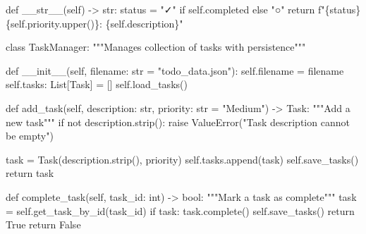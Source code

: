 \documentclass[
  letterpaper,
  DIV=11,
  numbers=noendperiod,
  oneside]{scrreprt}
\newenvironment{Shaded}{}{}
\newcommand{\BuiltInTok}[1]{\textcolor[rgb]{0.84,0.23,0.29}{#1}}
\newcommand{\CommentTok}[1]{\textcolor[rgb]{0.42,0.45,0.49}{#1}}
\newcommand{\ControlFlowTok}[1]{\textcolor[rgb]{0.84,0.23,0.29}{#1}}
\newcommand{\FunctionTok}[1]{\textcolor[rgb]{0.44,0.26,0.76}{#1}}
\newcommand{\KeywordTok}[1]{\textcolor[rgb]{0.84,0.23,0.29}{#1}}
\newcommand{\NormalTok}[1]{\textcolor[rgb]{0.14,0.16,0.18}{#1}}
\newcommand{\OperatorTok}[1]{\textcolor[rgb]{0.14,0.16,0.18}{#1}}
\newcommand{\PreprocessorTok}[1]{\textcolor[rgb]{0.84,0.23,0.29}{#1}}
\newcommand{\SpecialCharTok}[1]{\textcolor[rgb]{0.00,0.36,0.77}{#1}}
\newcommand{\SpecialStringTok}[1]{\textcolor[rgb]{0.01,0.18,0.38}{#1}}
\newcommand{\StringTok}[1]{\textcolor[rgb]{0.01,0.18,0.38}{#1}}
\newcommand{\VariableTok}[1]{\textcolor[rgb]{0.89,0.38,0.04}{#1}}
\begin{document}
\begin{Shaded}
\begin{Highlighting}[]
    \KeywordTok{def} \FunctionTok{\_\_str\_\_}\NormalTok{(}\VariableTok{self}\NormalTok{) }\OperatorTok{{-}\textgreater{}} \BuiltInTok{str}\NormalTok{:}
\NormalTok{        status }\OperatorTok{=} \StringTok{"✓"} \ControlFlowTok{if} \VariableTok{self}\NormalTok{.completed }\ControlFlowTok{else} \StringTok{"○"}
        \ControlFlowTok{return} \SpecialStringTok{f"}\SpecialCharTok{\{}\NormalTok{status}\SpecialCharTok{\}}\SpecialStringTok{ }\SpecialCharTok{\{}\VariableTok{self}\SpecialCharTok{.}\NormalTok{priority}\SpecialCharTok{.}\NormalTok{upper()}\SpecialCharTok{\}}\SpecialStringTok{: }\SpecialCharTok{\{}\VariableTok{self}\SpecialCharTok{.}\NormalTok{description}\SpecialCharTok{\}}\SpecialStringTok{"}

\KeywordTok{class}\NormalTok{ TaskManager:}
    \CommentTok{"""Manages collection of tasks with persistence"""}
    
    \KeywordTok{def} \FunctionTok{\_\_init\_\_}\NormalTok{(}\VariableTok{self}\NormalTok{, filename: }\BuiltInTok{str} \OperatorTok{=} \StringTok{"todo\_data.json"}\NormalTok{):}
        \VariableTok{self}\NormalTok{.filename }\OperatorTok{=}\NormalTok{ filename}
        \VariableTok{self}\NormalTok{.tasks: List[Task] }\OperatorTok{=}\NormalTok{ []}
        \VariableTok{self}\NormalTok{.load\_tasks()}
    
    \KeywordTok{def}\NormalTok{ add\_task(}\VariableTok{self}\NormalTok{, description: }\BuiltInTok{str}\NormalTok{, priority: }\BuiltInTok{str} \OperatorTok{=} \StringTok{"Medium"}\NormalTok{) }\OperatorTok{{-}\textgreater{}}\NormalTok{ Task:}
        \CommentTok{"""Add a new task"""}
        \ControlFlowTok{if} \KeywordTok{not}\NormalTok{ description.strip():}
            \ControlFlowTok{raise} \PreprocessorTok{ValueError}\NormalTok{(}\StringTok{"Task description cannot be empty"}\NormalTok{)}
        
\NormalTok{        task }\OperatorTok{=}\NormalTok{ Task(description.strip(), priority)}
        \VariableTok{self}\NormalTok{.tasks.append(task)}
        \VariableTok{self}\NormalTok{.save\_tasks()}
        \ControlFlowTok{return}\NormalTok{ task}
    
    \KeywordTok{def}\NormalTok{ complete\_task(}\VariableTok{self}\NormalTok{, task\_id: }\BuiltInTok{int}\NormalTok{) }\OperatorTok{{-}\textgreater{}} \BuiltInTok{bool}\NormalTok{:}
        \CommentTok{"""Mark a task as complete"""}
\NormalTok{        task }\OperatorTok{=} \VariableTok{self}\NormalTok{.get\_task\_by\_id(task\_id)}
        \ControlFlowTok{if}\NormalTok{ task:}
\NormalTok{            task.complete()}
            \VariableTok{self}\NormalTok{.save\_tasks()}
            \ControlFlowTok{return} \VariableTok{True}
        \ControlFlowTok{return} \VariableTok{False}
    

\end{Highlighting}
\end{Shaded}
\end{document}

